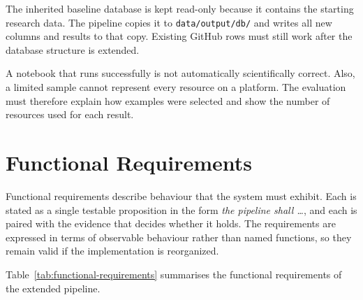 The inherited baseline database is kept read-only because it contains the starting research data. The pipeline copies it to \texttt{data/output/db/} and writes all new columns and results to that copy. Existing GitHub rows must still work after the database structure is extended.

A notebook that runs successfully is not automatically scientifically correct. Also, a limited sample cannot represent every resource on a platform. The evaluation must therefore explain how examples were selected and show the number of resources used for each result.

\clearpage
\section{Functional Requirements}

Functional requirements describe behaviour that the system must exhibit. Each is stated as a single testable proposition in the form \emph{the pipeline shall \dots}, and each is paired with the evidence that decides whether it holds. The requirements are expressed in terms of observable behaviour rather than named functions, so they remain valid if the implementation is reorganized.

Table~\ref{tab:functional-requirements} summarises the functional requirements of the extended pipeline.

